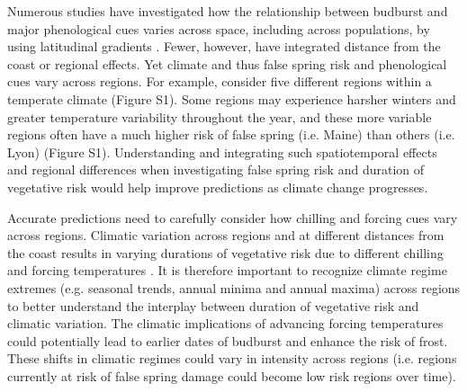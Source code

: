 \documentclass{article}\usepackage[]{graphicx}\usepackage[]{color}
\begin{document}
Numerous studies have investigated how the relationship between budburst and major phenological cues varies across space, including across populations, by using latitudinal gradients \citep{Partanen2004, Viheraaarnio2006, Caffarra2011, Zohner2016, Gauzere2017}. Fewer, however, have integrated distance from the coast \citep [but see][]{Myking2007, Harrington2015, Aitken2015} or regional effects. Yet climate and thus false spring risk and phenological cues vary across regions. For example, consider five different regions within a temperate climate (Figure S1). Some regions may experience harsher winters and greater temperature variability throughout the year, and these more variable regions often have a much higher risk of false spring (i.e. Maine) than others (i.e. Lyon) (Figure S1). Understanding and integrating such spatiotemporal effects and regional differences when investigating false spring risk and duration of vegetative risk would help improve predictions as climate change progresses.

Accurate predictions need to carefully consider how chilling and forcing cues vary across regions. %
Climatic variation across regions and at different distances from the coast results in varying durations of vegetative risk due to different chilling and forcing temperatures \citep{Myking2007}. It is therefore important to recognize climate regime extremes (e.g. seasonal trends, annual minima and annual maxima) across regions to better understand the interplay between duration of vegetative risk and climatic variation. The climatic implications of advancing forcing temperatures could potentially lead to earlier dates of budburst and enhance the risk of frost. These shifts in climatic regimes could vary in intensity across regions (i.e. regions currently at risk of false spring damage could become low risk regions over time). 
\end{document}
